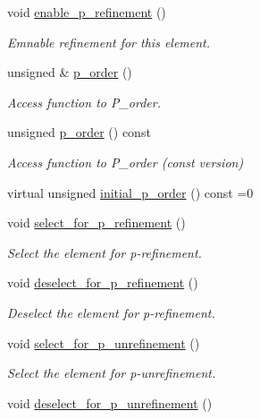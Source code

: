 \begin{DoxyCompactItemize}
void \hyperlink{classoomph_1_1PRefineableElement_a0c3aaa6e93d92bc06700016c1a195f32}{enable\+\_\+p\+\_\+refinement} ()
\begin{DoxyCompactList}\small\item\em Emnable refinement for this element. \end{DoxyCompactList}\item 
unsigned \& \hyperlink{classoomph_1_1PRefineableElement_a399d686caa2f65fff9c825d1ff55f053}{p\+\_\+order} ()
\begin{DoxyCompactList}\small\item\em Access function to P\+\_\+order. \end{DoxyCompactList}\item 
unsigned \hyperlink{classoomph_1_1PRefineableElement_ad1c4ca3d701eaca833fc9404b068c8f7}{p\+\_\+order} () const
\begin{DoxyCompactList}\small\item\em Access function to P\+\_\+order (const version) \end{DoxyCompactList}\item 
virtual unsigned \hyperlink{classoomph_1_1PRefineableElement_a6babd48e981414ad54cbfc1d89977f43}{initial\+\_\+p\+\_\+order} () const =0
\item 
void \hyperlink{classoomph_1_1PRefineableElement_a89ecf3e300ea9c7dd37ce981053377f4}{select\+\_\+for\+\_\+p\+\_\+refinement} ()
\begin{DoxyCompactList}\small\item\em Select the element for p-\/refinement. \end{DoxyCompactList}\item 
void \hyperlink{classoomph_1_1PRefineableElement_ae09fd11dea8f804c352a447a6bbdfb9a}{deselect\+\_\+for\+\_\+p\+\_\+refinement} ()
\begin{DoxyCompactList}\small\item\em Deselect the element for p-\/refinement. \end{DoxyCompactList}\item 
void \hyperlink{classoomph_1_1PRefineableElement_a99c9cb3bc0a1d6877f58e741f9b36df4}{select\+\_\+for\+\_\+p\+\_\+unrefinement} ()
\begin{DoxyCompactList}\small\item\em Select the element for p-\/unrefinement. \end{DoxyCompactList}\item 
void \hyperlink{classoomph_1_1PRefineableElement_a9885c7f63cc66df42692505f2261dc88}{deselect\+\_\+for\+\_\+p\+\_\+unrefinement} ()

\end{DoxyCompactItemize}
